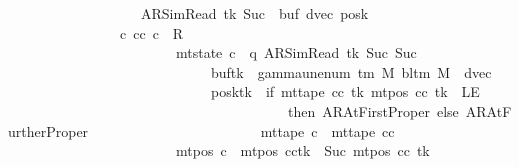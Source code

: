 \begin{isabellebody}
\ \ \ \ \ \ \ \ \ \ \ \ \ \ \ \ \ \ \ {\isacharparenleft}{\kern0pt}AR{\isacharunderscore}{\kern0pt}SimRead{\isacharcomma}{\kern0pt}\ tk{\isacharcomma}{\kern0pt}\ Suc\ {}{\isacharcomma}{\kern0pt}\ buf{\isacharcomma}{\kern0pt}\ dvec{\isacharcomma}{\kern0pt}\ posk{\isacharparenright}{\kern0pt}\ {\isasymrbrakk}\isanewline
\ \ \ \ \ \ \ \ \ \ \ \ \ \ \ {\isasymLongrightarrow}\ {\isasymexists}c{}{\isachardot}{\kern0pt}\ {\isacharparenleft}{\kern0pt}cc{\isacharcomma}{\kern0pt}\ c{}{\isacharparenright}{\kern0pt}\ {\isasymin}\ R{\isacharprime}{\kern0pt}\isanewline
\ \ \ \ \ \ \ \ \ \ \ \ \ \ \ \ \ \ \ \ \ \ \ {\isasymand}\ mt{\isacharunderscore}{\kern0pt}state\ c{}\ {\isacharequal}{\kern0pt}\ {\isacharparenleft}{\kern0pt}q{\isacharcomma}{\kern0pt}\ AR{\isacharunderscore}{\kern0pt}SimRead{\isacharcomma}{\kern0pt}\ tk{\isacharcomma}{\kern0pt}\ Suc\ {\isacharparenleft}{\kern0pt}Suc\ {}{\isacharparenright}{\kern0pt}{\isacharcomma}{\kern0pt}\isanewline
\ \ \ \ \ \ \ \ \ \ \ \ \ \ \ \ \ \ \ \ \ \ \ \ \ \ \ \ \ buf{\isacharparenleft}{\kern0pt}tk\ {\isacharcolon}{\kern0pt}{\isacharequal}{\kern0pt}\ gamma{\isacharunderscore}{\kern0pt}unenum\ {\isacharparenleft}{\kern0pt}{\isasymGamma}{\isacharunderscore}{\kern0pt}tm\ M{\isacharparenright}{\kern0pt}\ {\isacharparenleft}{\kern0pt}bl{\isacharunderscore}{\kern0pt}tm\ M{\isacharparenright}{\kern0pt}\ {}{\isacharparenright}{\kern0pt}{\isacharcomma}{\kern0pt}\ dvec{\isacharcomma}{\kern0pt}\isanewline
\ \ \ \ \ \ \ \ \ \ \ \ \ \ \ \ \ \ \ \ \ \ \ \ \ \ \ \ \ posk{\isacharparenleft}{\kern0pt}tk\ {\isacharcolon}{\kern0pt}{\isacharequal}{\kern0pt}\ if\ mt{\isacharunderscore}{\kern0pt}tape\ cc\ tk\ {\isacharparenleft}{\kern0pt}mt{\isacharunderscore}{\kern0pt}pos\ cc\ tk{\isacharparenright}{\kern0pt}\ {\isacharequal}{\kern0pt}\ LE{}\isanewline
\ \ \ \ \ \ \ \ \ \ \ \ \ \ \ \ \ \ \ \ \ \ \ \ \ \ \ \ \ \ \ \ \ \ \ \ \ \ \ \ then\ AR{\isacharunderscore}{\kern0pt}AtFirstProper\ else\ AR{\isacharunderscore}{\kern0pt}AtFurtherProper{\isacharparenright}{\kern0pt}{\isacharparenright}{\kern0pt}\isanewline
\ \ \ \ \ \ \ \ \ \ \ \ \ \ \ \ \ \ \ \ \ \ \ {\isasymand}\ mt{\isacharunderscore}{\kern0pt}tape\ c{}\ {\isacharequal}{\kern0pt}\ mt{\isacharunderscore}{\kern0pt}tape\ cc\isanewline
\ \ \ \ \ \ \ \ \ \ \ \ \ \ \ \ \ \ \ \ \ \ \ {\isasymand}\ mt{\isacharunderscore}{\kern0pt}pos\ c{}\ {\isacharequal}{\kern0pt}\ {\isacharparenleft}{\kern0pt}mt{\isacharunderscore}{\kern0pt}pos\ cc{\isacharparenright}{\kern0pt}{\isacharparenleft}{\kern0pt}tk\ {\isacharcolon}{\kern0pt}{\isacharequal}{\kern0pt}\ Suc\ {\isacharparenleft}{\kern0pt}mt{\isacharunderscore}{\kern0pt}pos\ cc\ tk{\isacharparenright}{\kern0pt}{\isacharparenright}{\kern0pt}{\isachardoublequoteclose}\isanewline

\end{isabellebody}
